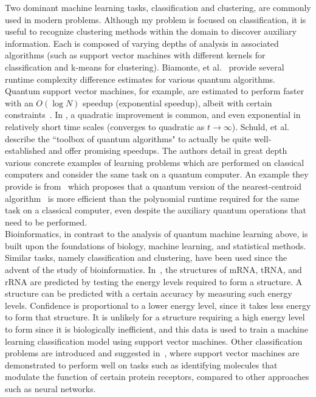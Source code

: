 \documentclass{article}
\begin{document}
  Two dominant machine learning tasks, classification and clustering, are commonly used in modern problems. Although my problem is focused on classification, it is useful to recognize clustering methods within the domain to discover auxiliary information. Each is composed of varying depths of analysis in associated algorithms (such as support vector machines with different kernels for classification and k-means for clustering). Biamonte, et al.~\cite{biamonte} provide several runtime complexity difference estimates for various quantum algorithms. Quantum support vector machines, for example, are estimated to perform faster with an $O(\log{N})$ speedup (exponential speedup), albeit with certain constraints~\cite{aaronson}. In \cite{dunjko}, a quadratic improvement is common, and even exponential in relatively short time scales (converges to quadratic as $t \rightarrow \infty$). Schuld, et al.~\cite{schuld} describe the ``toolbox of quantum algorithms" to actually be quite well-established and offer promising speedups. The authors detail in great depth various concrete examples of learning problems which are performed on classical computers and consider the same task on a quantum computer. An example they provide is from~\cite{lloyd} which proposes that a quantum version of the nearest-centroid algorithm~\cite{centroid} is more efficient than the polynomial runtime required for the same task on a classical computer, even despite the auxiliary quantum operations that need to be performed. \\

  Bioinformatics, in contrast to the analysis of quantum machine learning above, is built upon the foundations of biology, machine learning, and statistical methods. Similar tasks, namely classification and clustering, have been used since the advent of the study of bioinformatics. In~\cite{ward}, the structures of mRNA, tRNA, and rRNA are predicted by testing the energy levels required to form a structure. A structure can be predicted with a certain accuracy by measuring such energy levels. Confidence is proportional to a lower energy level, since it takes less energy to form that structure. It is unlikely for a structure requiring a high energy level to form since it is biologically inefficient, and this data is used to train a machine learning classification model using support vector machines. Other classification problems are introduced and suggested in~\cite{byvatov}, where support vector machines are demonstrated to perform well on tasks such as identifying molecules that modulate the function of certain protein receptors, compared to other approaches such as neural networks. \\
\end{document}
